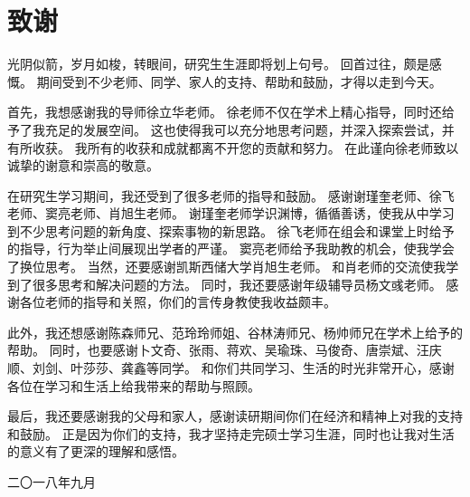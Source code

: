 \chapter*{ 致\qquad 谢}



光阴似箭，岁月如梭，转眼间，研究生生涯即将划上句号。
回首过往，颇是感慨。
期间受到不少老师、同学、家人的支持、帮助和鼓励，才得以走到今天。

首先，我想感谢我的导师徐立华老师。
徐老师不仅在学术上精心指导，同时还给予了我充足的发展空间。
这也使得我可以充分地思考问题，并深入探索尝试，并有所收获。
我所有的收获和成就都离不开您的贡献和努力。
在此谨向徐老师致以诚挚的谢意和崇高的敬意。




在研究生学习期间，我还受到了很多老师的指导和鼓励。
感谢谢瑾奎老师、徐飞老师、窦亮老师、肖旭生老师。
谢瑾奎老师学识渊博，循循善诱，使我从中学习到不少思考问题的新角度、探索事物的新思路。
徐飞老师在组会和课堂上时给予的指导，行为举止间展现出学者的严谨。
窦亮老师给予我助教的机会，使我学会了换位思考。
当然，还要感谢凯斯西储大学肖旭生老师。
和肖老师的交流使我学到了很多思考和解决问题的方法。
同时，我还要感谢年级辅导员杨文彧老师。
感谢各位老师的指导和关照，你们的言传身教使我收益颇丰。

此外，我还想感谢陈森师兄、范玲玲师姐、谷林涛师兄、杨帅师兄在学术上给予的帮助。
同时，也要感谢卜文奇、张雨、蒋欢、吴瑜珠、马俊奇、唐崇斌、汪庆顺、刘剑、叶莎莎、龚鑫等同学。
和你们共同学习、生活的时光非常开心，感谢各位在学习和生活上给我带来的帮助与照顾。


最后，我还要感谢我的父母和家人，感谢读研期间你们在经济和精神上对我的支持和鼓励。
正是因为你们的支持，我才坚持走完硕士学习生涯，同时也让我对生活的意义有了更深的理解和感悟。

\vspace{0.2cm} 

\hspace{10.6cm}  二〇一八年九月 



